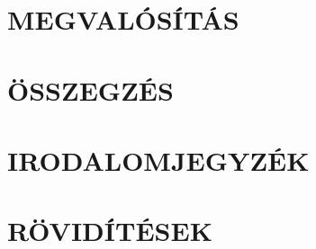 \documentclass[12pt,a4paper]{article}
\begin{document}
\clearpage
\section{MEGVALÓSÍTÁS}


\clearpage
\section{ÖSSZEGZÉS}






\clearpage
\section{IRODALOMJEGYZÉK}
\printbibliography[heading=none]

\clearpage
\renewcommand{\listfigurename}{ÁBRAJEGYZÉK}
\listoffigures

\clearpage
\renewcommand{\listtablename}{TÁBLAJEGYZÉK}
\listoftables

\clearpage
\section{RÖVIDÍTÉSEK}

\end{document}
